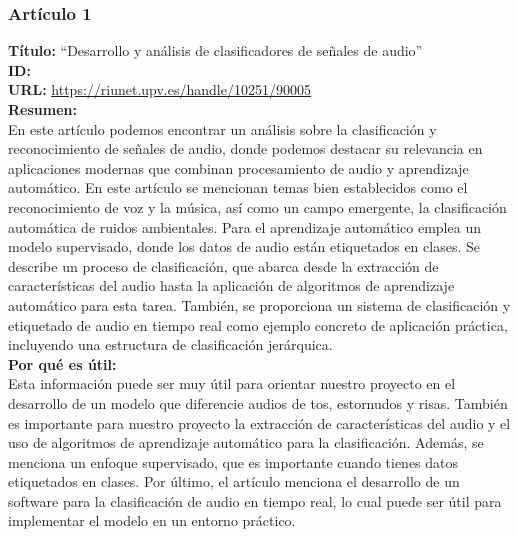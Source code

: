 \subsubsection*{Artículo 1}
    \textbf{Título:}
    “Desarrollo y análisis de clasificadores de señales de audio”
    \\
    \textbf{ID: \cite{aguirre2017desarrollo}}
    \\
    \textbf{URL:}
    \url{https://riunet.upv.es/handle/10251/90005}
    \\
    \textbf{Resumen:\\}
    En este artículo podemos encontrar un análisis sobre la clasificación y reconocimiento de señales de audio, donde podemos destacar su relevancia en aplicaciones modernas que combinan procesamiento de audio y aprendizaje automático. En este artículo se mencionan temas bien establecidos como el reconocimiento de voz y la música, así como un campo emergente, la clasificación automática de ruidos ambientales. Para el aprendizaje automático emplea un modelo supervisado, donde los datos de audio están etiquetados en clases. Se describe un proceso de clasificación, que abarca desde la extracción de características del audio hasta la aplicación de algoritmos de aprendizaje automático para esta tarea. También, se proporciona un sistema de clasificación y etiquetado de audio en tiempo real como ejemplo concreto de aplicación práctica, incluyendo una estructura de clasificación jerárquica.
    \\
    \textbf{Por qué es útil:\\}
    Esta información puede ser muy útil para orientar nuestro proyecto en el desarrollo de un modelo que diferencie audios de tos, estornudos y risas. También es importante para nuestro proyecto la extracción de características del audio y el uso de algoritmos de aprendizaje automático para la clasificación. Además, se menciona un enfoque supervisado, que es importante cuando tienes datos etiquetados en clases. Por último, el artículo menciona el desarrollo de un software para la clasificación de audio en tiempo real, lo cual puede ser útil para implementar el modelo en un entorno práctico.
